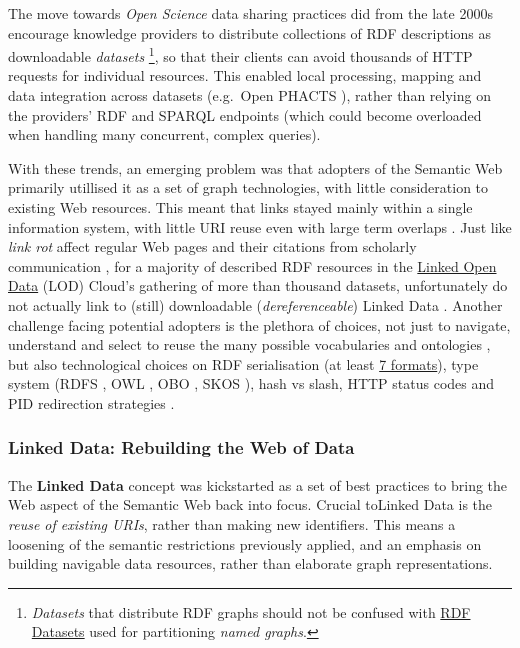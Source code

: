 \documentclass[fleqn,10pt,NOlineno]{wlpeerjlua}
\begin{document}
The move towards \emph{Open Science} data sharing practices did from the late 2000s encourage knowledge providers to distribute collections of RDF descriptions as downloadable \emph{datasets} \footnote{\emph{Datasets} that distribute RDF graphs should not be confused with \href{https://www.w3.org/TR/rdf11-concepts/\#section-dataset}{RDF Datasets} used for partitioning \emph{named graphs}.}, so that their clients can avoid thousands of HTTP requests for individual resources. This enabled local processing, mapping and data integration across datasets (e.g.~Open PHACTS \autocite{grothAPIcentricLinkedData2014b}), rather than relying on the providers' RDF and SPARQL endpoints (which could become overloaded when handling many concurrent, complex queries).

With these trends, an emerging problem was that adopters of the Semantic Web primarily utillised it as a set of graph technologies, with little consideration to existing Web resources. This meant that links stayed mainly within a single information system, with little URI reuse even with large term overlaps \autocite{kamdarSystematicAnalysisTerm2017a}. Just like \emph{link rot} affect regular Web pages and their citations from scholarly communication \autocite{kleinScholarlyContextNot2014a}, for a majority of described RDF resources in the \href{https://lod-cloud.net/}{Linked Open Data} (LOD) Cloud's gathering of more than thousand datasets, unfortunately do not actually link to (still) downloadable (\emph{dereferenceable}) Linked Data \autocite{polleresMoreDecentralizedVision2020a}. Another challenge facing potential adopters is the plethora of choices, not just to navigate, understand and select to reuse the many possible vocabularies and ontologies \autocite{carrieroLandscapeOntologyReuse2020a}, but also technological choices on RDF serialisation (at least \href{https://www.w3.org/TR/rdf11-primer/\#section-graph-syntax}{7 formats}), type system (RDFS \autocite{w3-rdf-schema}, OWL \autocite{w3-owl2-overview}, OBO \autocite{tirmiziMappingOBOOWL2011a}, SKOS \autocite{w3-skos-primer}), hash vs slash, HTTP status codes and PID redirection strategies \autocite{sauermannCoolURIsSemantic2011}.

\subsubsection*{Linked Data: Rebuilding the Web of Data}\label{sec:ld-web}

The \textbf{Linked Data} concept \autocite{bizerLinkedDataStory2009a} was kickstarted as a set of best practices \autocite{LinkedDataDesign} to bring the Web aspect of the Semantic Web back into focus. Crucial toLinked Data is the \emph{reuse of existing URIs}, rather than making new identifiers. This means a loosening of the semantic restrictions previously applied, and an emphasis on building navigable data resources, rather than elaborate graph representations.
\end{document}
